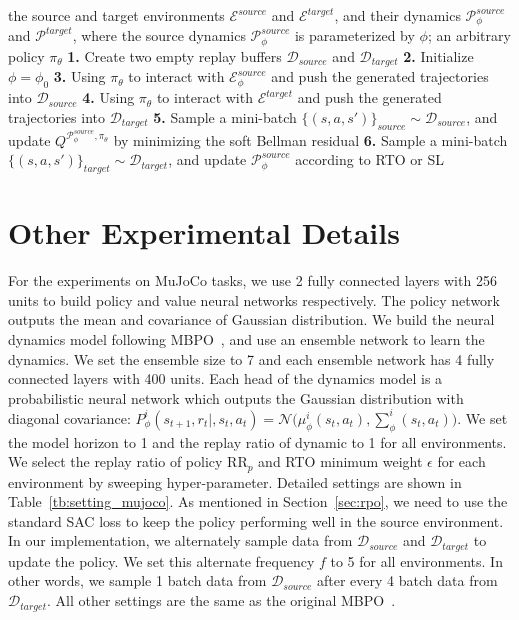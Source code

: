 \documentclass[letterpaper]{article} %
\def\P{{\mathcal{P}}}
\begin{document}
\begin{algorithm}[h]
\small
   \caption{Relative Transition Optimization (RTO)}
   \label{alg:rto}
\begin{algorithmic}
    the source and target environments $\mathcal{E}^{source}$ and $\mathcal{E}^{target}$, and their dynamics $\P_{\phi}^{source}$ and $\P^{target}$, where the source dynamics $\P_{\phi}^{source}$ is parameterized by $\phi$; an arbitrary policy $\pi_{\theta}$\;
   \STATE \textbf{1.} Create two empty replay buffers $\mathcal{D}_{source}$ and $\mathcal{D}_{target}$\;
   \STATE \textbf{2.} Initialize $\phi=\phi_0$\;
   \REPEAT
   \STATE \textbf{3.} Using $\pi_{\theta}$ to interact with $\mathcal{E}_{\phi}^{source}$ and push the generated trajectories into $\mathcal{D}_{source}$\;
   \STATE \textbf{4.} Using $\pi_{\theta}$ to interact with $\mathcal{E}^{target}$ and push the generated trajectories into $\mathcal{D}_{target}$\;
   \STATE \textbf{5.} Sample a mini-batch $\{(s,a,s')\}_{source}\sim\mathcal{D}_{source}$, and update $Q^{\P_{\phi}^{source},\pi_{\theta}}$ by minimizing the soft Bellman residual\;
   \STATE \textbf{6.} Sample a mini-batch $\{(s,a,s')\}_{target}\sim\mathcal{D}_{target}$, and update $\P_{\phi}^{source}$ according to RTO or SL\;
\end{algorithmic}
\end{algorithm}


\section{Other Experimental Details}
\label{sec:G}
For the experiments on MuJoCo tasks, we use 2 fully connected layers with 256 units to build policy and value neural networks respectively. The policy network outputs the mean and covariance of Gaussian distribution. We build the neural dynamics model following MBPO~\cite{janner2019trust}, and use an ensemble network to learn the dynamics.
We set the ensemble size to 7 and each ensemble network has 4 fully connected layers with 400 units.
Each head of the dynamics model is a probabilistic neural network which outputs the Gaussian distribution with diagonal covariance: $P_{\phi}^i(s_{t+1}, r_t|, s_t, a_t) = \mathcal{N}\big(\mu_{\phi}^i(s_t, a_t), \sum_{\phi}^i(s_t,a_t)\big)$. We set the model horizon to 1 and the replay ratio of dynamic to 1 for all environments.
We select the replay ratio of policy $\mathrm{RR}_p$ and RTO minimum weight $\epsilon$ for each environment by sweeping hyper-parameter. Detailed settings are shown in Table~\ref{tb:setting_mujoco}. 
As mentioned in Section~\ref{sec:rpo}, we need to use the standard SAC loss to keep the policy performing well in the source environment. In our implementation, we alternately sample data from $\mathcal{D}_{source}$ and $\mathcal{D}_{target}$ to update the policy. We set this alternate frequency $f$ to 5 for all environments.
In other words, we sample 1 batch data from $\mathcal{D}_{source}$ after every 4 batch data from $\mathcal{D}_{target}$.
All other settings are the same as the original MBPO~\cite{janner2019trust}.
\end{document}
